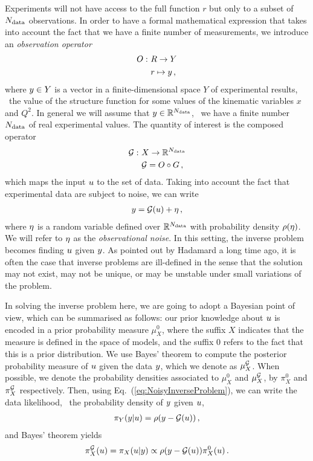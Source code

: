 Experiments will not have access to the full function $r$ but
only to a subset of $N_{\rm data}$ observations. In order to have a formal
mathematical expression that takes into account the fact that we have a finite
number of measurements, we introduce an {\em observation operator}
\begin{align}
  O : ~& R \to Y \nonumber \\
       & r \mapsto y \, ,
\end{align}
where $y \in Y$ is a vector in a finite-dimensional space $Y$ of experimental
results, \eg\ the value of the structure function for some values of the
kinematic variables $x$ and $Q^2$. In general we will assume that $y \in
\mathbb{R}^{N_{\rm data}}$, \ie\ we have a finite number $N_{\rm data}$ of real experimental
values. The quantity of interest is the composed operator
\begin{align}
  \mathcal{G} : ~& X \to \mathbb{R}^{N_{\rm data}} \nonumber \\
                 & \mathcal{G} = O \circ G\, ,
\end{align}
which maps the input $u$ to the set of data. Taking into account the
fact that experimental data are subject to noise, we can write
\begin{align}
  \label{eq:NoisyInverseProblem}
  y = \mathcal{G}(u) + \eta\, ,
\end{align}
where $\eta$ is a random variable defined over $\mathbb{R}^{N_{\rm data}}$ with
probability density $\rho(\eta)$. We will refer to $\eta$ as the {\em
observational noise}. In this setting, the inverse problem becomes finding
$u$ given $y$. As pointed out by Hadamard a long time ago, it is
often the case that inverse problems are ill-defined in the sense that the
solution may not exist, may not be unique, or may be unstable under small
variations of the problem. 

In solving the inverse problem here, we are going to adopt a Bayesian point of view, which
can be summarised as follows: our prior knowledge about $u$ is encoded
in a prior probability measure $\mu_X^0$, where the suffix $X$ indicates that
the measure is defined in the space of models, and the suffix 0 refers to the
fact that this is a prior distribution. We use Bayes' theorem to compute the
posterior probability measure of $u$ given the data $y$, which we
denote as $\mu_X^{\mathcal{G}}$. When possible, we denote the probability densities
associated to $\mu_X^0$ and $\mu_X^{\mathcal{G}}$, by $\pi_X^0$ and
$\pi_X^{\mathcal{G}}$ respectively. Then, using Eq.~(\ref{eq:NoisyInverseProblem}),
we can write the data likelihood, \ie\ the probability density of $y$ given
$u$,
\begin{align}
  \label{eq:YGivenUProbDensity}
  \pi_Y(y|u) = \rho(y-\mathcal{G}(u))\, ,
\end{align}
and Bayes' theorem yields
\begin{align}
  \label{eq:BayesThmInversePosterior}
  \pi_X^{\mathcal{G}}(u) = \pi_X(u|y) \propto \rho(y-\mathcal{G}(u)) \pi_X^0(u)\, .
\end{align}

